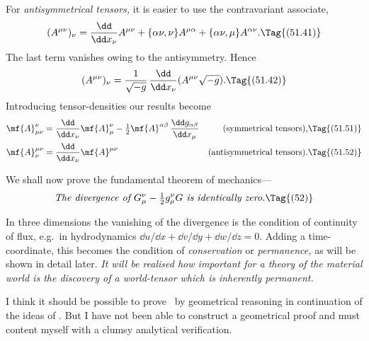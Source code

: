 \documentclass[12pt]{book}
\begin{document}
For \emph{antisymmetrical tensors,} it is easier to use the contravariant associate,
\[
(A^{\mu\nu})_{\nu}
= \frac{\dd}{\dd x_{\nu}} A^{\mu\nu} + \{\alpha\nu,\nu\} A^{\mu\alpha} + \{\alpha\nu, \mu\} A^{\alpha\nu}.
\Tag{(51.41)}
\]
The last term vanishes owing to the antisymmetry. Hence
\[
(A^{\mu\nu})_{\nu}
= \frac{1}{\sqrt{-g}}\, \frac{\dd}{\dd x_{\nu}} (A^{\mu\nu} \sqrt{-g}).
\Tag{(51.42)}
\]
Introducing tensor\hyp{}densities our results become
\begin{align*}
  \mf{A}_{\mu\nu}^{\nu}
  &= \frac{\dd}{\dd x_{\nu}} \mf{A}_{\mu}^{\nu}
  - \tfrac{1}{2} \mf{A}^{\alpha\beta}\, \frac{\dd g_{\alpha\beta}}{\dd x_{\mu}}
  & \text{(symmetrical tensors),}&
  \Tag{(51.51)} \\
  \mf{A}_{\nu}^{\mu\nu}
  &= \frac{\dd}{\dd x_{\nu}} \mf{A}^{\mu\nu}
  & \text{(antisymmetrical tensors).} &
  \Tag{(51.52)}
\end{align*}

%

We shall now prove the fundamental theorem of me\-cha\-nics---
%
\[
\text{\emph{The divergence of $G_{\mu}^{\nu} - \tfrac{1}{2}g_{\mu}^{\nu} G$ is identically zero.}}
\index{Divergence!energy@of energy\hyp{}tensor}%
\Tag{(52)}
\]

In three dimensions the vanishing of the divergence is the condition of
continuity of flux, e.g.\ in hydrodynamics $\dd u/\dd x + \dd v/\dd y + \dd w/\dd z = 0$. Adding a
time\hyp{}coordinate, this becomes the condition of \emph{conservation} or \emph{permanence,} as
%
will be shown in detail later. \emph{It will be realised how important for a theory
of the material world is the discovery of a world\hyp{}tensor which is inherently
permanent.}

I think it should be possible to prove~ by geometrical reasoning in
continuation of the ideas of . But I have not been able to construct a
geometrical proof and must content myself with a clumsy analytical verification.
\end{document}

